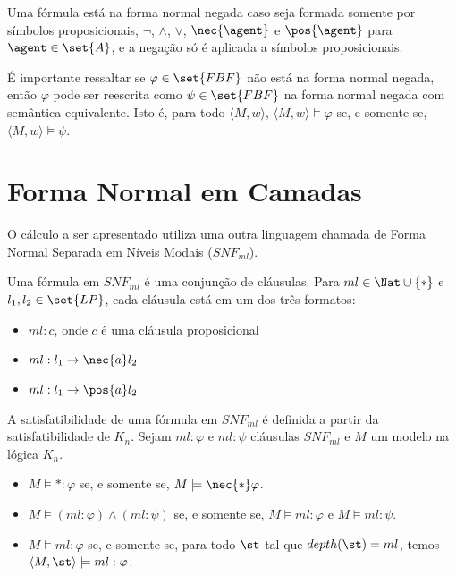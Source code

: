 \begin{definition}
	Uma fórmula está na forma normal negada caso seja formada somente por símbolos proposicionais, $\neg$, $\land$, $\lor$, $\nec{\agent}$ e $\pos{\agent}$ para $\agent \in \set{A}$, e a negação só é aplicada a símbolos proposicionais.
\end{definition}

É importante ressaltar se $\varphi \in \set{FBF}$ não está na forma normal negada, então $\varphi$ pode ser reescrita como $\psi \in \set{FBF}$ na forma normal negada com semântica equivalente. Isto é, para todo $\langle M, w \rangle$, $\langle M, w \rangle \models \varphi$ se, e somente se, $\langle M, w \rangle \models \psi$.

\section{Forma Normal em Camadas}
O cálculo a ser apresentado utiliza uma outra linguagem chamada de Forma Normal Separada em Níveis Modais ($SNF_{ml}$).

\begin{definition}
	Uma fórmula em $SNF_{ml}$ é uma conjunção de cláusulas. Para $ml \in \Nat \cup \{*\}$ e $l_1, l_2 \in \set{LP}$, cada cláusula está em um dos três formatos:
	\begin{itemize}
		\item $ml: c$, onde $c$ é uma cláusula proposicional
		\item $ml: l_1 \rightarrow \nec{a}l_2$
		\item $ml: l_1 \rightarrow \pos{a}l_2$
	\end{itemize}
\end{definition}

A satisfatibilidade de uma fórmula em $SNF_{ml}$ é definida a partir da satisfatibilidade de $K_n$. Sejam $ml: \varphi$ e $ml: \psi$ cláusulas $SNF_{ml}$ e $M$ um modelo na lógica $K_n$.

\begin{itemize}
	\item $M \models *: \varphi$ se, e somente se, $M \models \nec{*}\varphi$.
	\item $M \models (ml: \varphi) \land (ml: \psi)$ se, e somente se, $M \models ml: \varphi$ e $M \models ml: \psi$.
	\item $M \models ml: \varphi$ se, e somente se, para todo $\st$ tal que $depth(\st) = ml$, temos $\langle M, \st \rangle \models ml: \varphi$.
\end{itemize}


